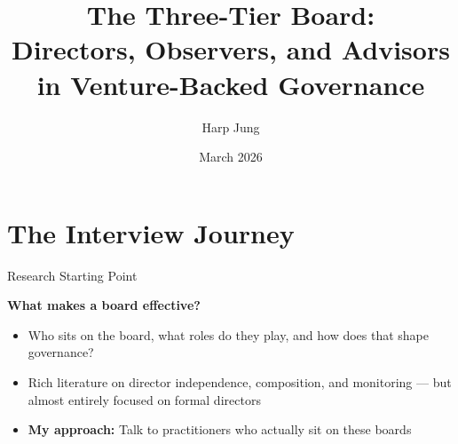 \documentclass[aspectratio=169,12pt]{beamer}
\title[Board Observers]{The Three-Tier Board:\\Directors, Observers, and Advisors\\in Venture-Backed Governance}
\author{Harp Jung}
\institute{Harvard University}
\date{March 2026}
\begin{document}
\begin{frame}
\titlepage
\end{frame}

\section{The Interview Journey}

\begin{frame}{Research Starting Point}
\begin{center}
\Large\textbf{What makes a board effective?}
\end{center}
\vspace{1em}
\begin{itemize}
\item Who sits on the board, what roles do they play, and how does that shape governance?
\item Rich literature on director independence, composition, and monitoring --- but almost entirely focused on formal directors
\item \textbf{My approach:} Talk to practitioners who actually sit on these boards
\end{itemize}
\end{frame}
\end{document}
